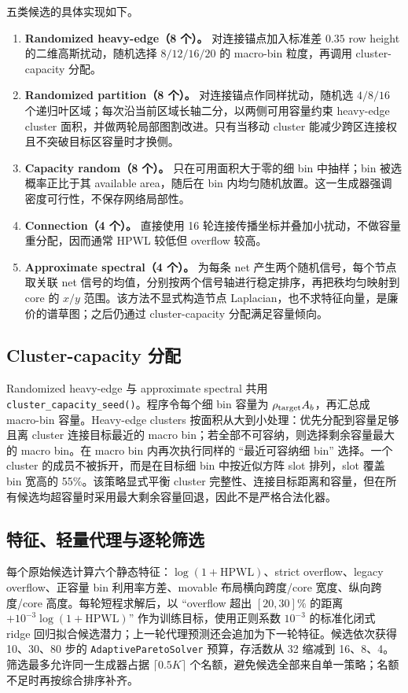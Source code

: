 \documentclass[11pt,a4paper]{ctexart}
\begin{document}
五类候选的具体实现如下。
\begin{enumerate}
  \item \textbf{Randomized heavy-edge（8 个）。} 对连接锚点加入标准差 $0.35$ row height 的二维高斯扰动，随机选择 $8/12/16/20$ 的 macro-bin 粒度，再调用 cluster-capacity 分配。
  \item \textbf{Randomized partition（8 个）。} 对连接锚点作同样扰动，随机选 $4/8/16$ 个递归叶区域；每次沿当前区域长轴二分，以两侧可用容量约束 heavy-edge cluster 面积，并做两轮局部图割改进。只有当移动 cluster 能减少跨区连接权且不突破目标区容量时才换侧。
  \item \textbf{Capacity random（8 个）。} 只在可用面积大于零的细 bin 中抽样；bin 被选概率正比于其 available area，随后在 bin 内均匀随机放置。这一生成器强调密度可行性，不保存网络局部性。
  \item \textbf{Connection（4 个）。} 直接使用 16 轮连接传播坐标并叠加小扰动，不做容量重分配，因而通常 HPWL 较低但 overflow 较高。
  \item \textbf{Approximate spectral（4 个）。} 为每条 net 产生两个随机信号，每个节点取关联 net 信号的均值，分别按两个信号轴进行稳定排序，再把秩均匀映射到 core 的 $x/y$ 范围。该方法不显式构造节点 Laplacian，也不求特征向量，是廉价的谱草图；之后仍通过 cluster-capacity 分配满足容量倾向。
\end{enumerate}

\subsection{Cluster-capacity 分配}
Randomized heavy-edge 与 approximate spectral 共用 \texttt{cluster\_capacity\_seed()}。程序令每个细 bin 容量为 $\rho_{\rm target}A_b$，再汇总成 macro-bin 容量。Heavy-edge clusters 按面积从大到小处理：优先分配到容量足够且离 cluster 连接目标最近的 macro bin；若全部不可容纳，则选择剩余容量最大的 macro bin。在 macro bin 内再次执行同样的 ``最近可容纳细 bin'' 选择。一个 cluster 的成员不被拆开，而是在目标细 bin 中按近似方阵 slot 排列，slot 覆盖 bin 宽高的 55\%。该策略显式平衡 cluster 完整性、连接目标距离和容量，但在所有候选均超容量时采用最大剩余容量回退，因此不是严格合法化器。

\subsection{特征、轻量代理与逐轮筛选}
每个原始候选计算六个静态特征：$\log(1+\mathrm{HPWL})$、strict overflow、legacy overflow、正容量 bin 利用率方差、movable 布局横向跨度/core 宽度、纵向跨度/core 高度。每轮短程求解后，以 ``overflow 超出 $[20,30]\%$ 的距离 $+10^{-3}\log(1+\mathrm{HPWL})$'' 作为训练目标，使用正则系数 $10^{-3}$ 的标准化闭式 ridge 回归拟合候选潜力；上一轮代理预测还会追加为下一轮特征。候选依次获得 10、30、80 步的 \texttt{AdaptiveParetoSolver} 预算，存活数从 32 缩减到 16、8、4。筛选最多允许同一生成器占据 $\lceil0.5K\rceil$ 个名额，避免候选全部来自单一策略；名额不足时再按综合排序补齐。
\end{document}
